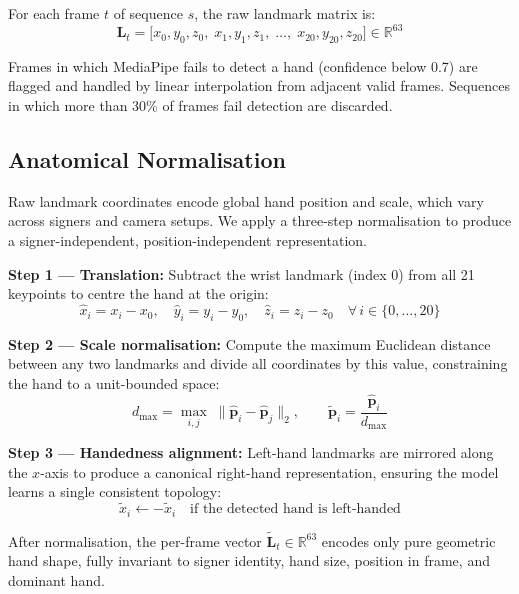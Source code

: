 \documentclass[conference]{IEEEtran}
\begin{document}
For each frame $t$ of sequence $s$, the raw landmark matrix is:
\begin{equation}
  \mathbf{L}_t = \bigl[x_0, y_0, z_0,\; x_1, y_1, z_1,\; \ldots,\;
                       x_{20}, y_{20}, z_{20}\bigr] \in \mathbb{R}^{63}
\end{equation}

Frames in which MediaPipe fails to detect a hand (confidence below 0.7) are
flagged and handled by linear interpolation from adjacent valid frames. Sequences
in which more than 30\% of frames fail detection are discarded.

\subsection{Anatomical Normalisation}

Raw landmark coordinates encode global hand position and scale, which vary across
signers and camera setups. We apply a three-step normalisation to produce a
signer-independent, position-independent representation.

\textbf{Step 1 --- Translation:} Subtract the wrist landmark (index 0) from all
21 keypoints to centre the hand at the origin:
\begin{equation}
  \hat{x}_i = x_i - x_0, \quad
  \hat{y}_i = y_i - y_0, \quad
  \hat{z}_i = z_i - z_0 \quad \forall\, i \in \{0,\ldots,20\}
\end{equation}

\textbf{Step 2 --- Scale normalisation:} Compute the maximum Euclidean distance
between any two landmarks and divide all coordinates by this value, constraining
the hand to a unit-bounded space:
\begin{equation}
  d_{\max} = \max_{i,j}\; \|\hat{\mathbf{p}}_i - \hat{\mathbf{p}}_j\|_2,
  \qquad
  \tilde{\mathbf{p}}_i = \frac{\hat{\mathbf{p}}_i}{d_{\max}}
\end{equation}

\textbf{Step 3 --- Handedness alignment:} Left-hand landmarks are mirrored along
the $x$-axis to produce a canonical right-hand representation, ensuring the
model learns a single consistent topology:
\begin{equation}
  \tilde{x}_i \leftarrow -\tilde{x}_i \quad
  \text{if the detected hand is left-handed}
\end{equation}

After normalisation, the per-frame vector $\tilde{\mathbf{L}}_t \in \mathbb{R}^{63}$
encodes only pure geometric hand shape, fully invariant to signer identity,
hand size, position in frame, and dominant hand.
\end{document}
